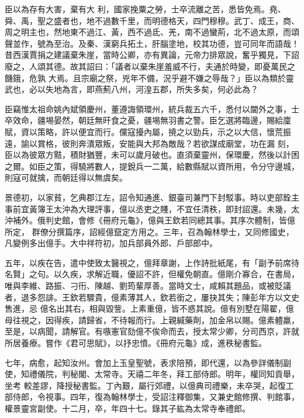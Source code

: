 \begin{pinyinscope}
 臣以為存有大害，棄有大
 利，國家挽粟之勞，士卒流離之苦，悉皆免焉。堯、舜、禹，聖之盛者也，地不過數千里，而明德格天，四門穆穆。武丁、成王，商、周之明主也，然地東不過江、黃，西不過氐、羌，南不過蠻荊，北不過太原，而頌聲並作，號為至治。及秦、漢窮兵拓土，肝腦塗地，校其功德，豈可同年而語哉！昔西漢賈捐之建議棄朱崖，當時公卿，亦有異論，元帝力排眾說，奮乎獨見，下詔廢之，人頌其德。故其詔曰：「議者以棄朱崖羞威不行，夫通於時變，即憂萬民之饑鋨，危孰
 大焉。且宗廟之祭，兇年不備，況乎避不嫌之辱哉？」臣以為類於靈武也，必以失地為言，即燕薊八州，河湟五郡，所失多矣，何必此為？



 臣竊惟太祖命姚內斌領慶州，董遵誨領環州，統兵裁五六千，悉付以閫外之事，士卒效命，疆埸晏然，朝廷無旰食之憂，疆埸無羽書之警。臣乞選將臨邊，賜給廩賦，資以策略，許以便宜而行。儻寇擾內屬，撓之以勁兵，示之以大信，懷荒振遠，諭以賞格，彼則奔潰眾叛，安能與大邦為敵哉？若欲謀成廟堂，功在漏
 刻，臣以為彼眾方黠，積財猶豐，未可以歲月破也。直須棄靈州，保環慶，然後以計困之爾。如臣之策，得驍將數人，提銳兵一二萬，給數縣賦以資所用，令分守邊城，則寇可就擒，而朝廷得以無虞矣。



 景德初，以家貧，乞典郡江左，詔令知通進、銀臺司兼門下封駁事。時以吏部銓主事前宜黃簿王太沖為大理評事，億以丞吏之賤，不宜任清秩，即封詔還。未幾，太沖補外。俄判史館，會修《冊府元龜》，億與王欽若同總其事。其序次體制，皆億所定，
 群僚分撰篇序，詔經億竄定方用之。三年，召為翰林學士，又同修國史，凡變例多出億手。大中祥符初，加兵部員外郎、戶部郎中。



 五年，以疾在告，遣中使致太醫視之，億拜章謝，上作詩批紙尾，有「副予前席待名賢」之句。以久疾，求解近職，優詔不許，但權免朝直。億剛介寡合，在書局，唯與李維、路振、刁衎、陳越、劉筠輩厚善。當時文士，咸賴其題品，或被貶議者，退多怨誹。王欽若驟貴，億素薄其人，欽若銜之，屢抉其失；陳彭年方以文史售進，忌
 億名出其右，相與毀訾。上素重億，皆不惑其說。億有別墅在陽翟，億母往視之，因得疾，請歸省，不待報而行。上親緘藥劑，加金帛以賜。億素體羸，至是，以病聞，請解官。有嗾憲官劾億不俟命而去，授太常少卿，分司西京，許就所居養療。嘗作《君可思賦》，以抒忠憤。《冊府元龜》成，進秩秘書監。



 七年，病愈，起知汝州。會加上玉皇聖號，表求陪預，即代還，以為參詳儀制副使，知禮儀院，判秘閣、太常寺。天禧二年冬，拜工部侍郎。明年，權同知貢舉，坐考
 較差謬，降授秘書監。丁內艱，屬行郊禮，以億典司禮樂，未卒哭，起復工部侍郎，令視事。四年，復為翰林學士，受詔注釋御集，又兼史館修撰、判館事，權景靈宮副使。十二月，卒，年四十七。錄其子紘為太常寺奉禮郎。




\end{pinyinscope}
